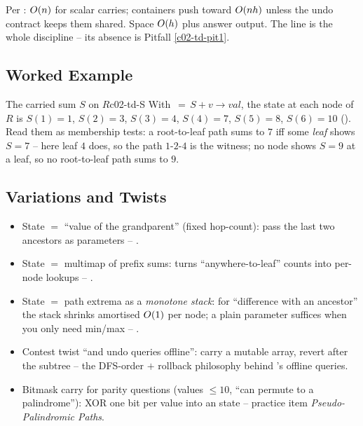 \begin{complexitybox}
Per : $O(n)$ for scalar carries; containers push
toward $O(nh)$ unless the undo contract keeps them shared. Space $O(h)$
plus answer output. The  line is the whole discipline -- its absence
is Pitfall \ref{c02-td-pit1}.
\end{complexitybox}

\subsection{Worked Example}

\begin{example}{The carried sum $S$ on $R$}{c02-td-S}
With ${}\,=\,S + v\to\mathit{val}$, the state at each node of $R$ is
$S(1){=}1$, $S(2){=}3$, $S(3){=}4$, $S(4){=}7$, $S(5){=}8$, $S(6){=}10$
(). Read them as membership tests: a root-to-leaf path sums to
$7$ iff some \emph{leaf} shows $S=7$ -- here leaf $4$ does, so the path
$1\text{-}2\text{-}4$ is the witness; no node shows $S=9$ at a leaf, so no
root-to-leaf path sums to $9$.
\end{example}

\subsection{Variations and Twists}

\begin{itemize}[nosep]
  \item State $=$ ``value of the grandparent'' (fixed hop-count): pass the last
        two ancestors as parameters -- .      \hfill{}
  \item State $=$ multimap of prefix sums: turns ``anywhere-to-leaf'' counts into
        per-node lookups -- .                \hfill{}
  \item State $=$ path extrema as a \emph{monotone stack}: for
        ``difference with an ancestor'' the stack shrinks amortised
        $O(1)$ per node; a plain parameter suffices when you only need
        min/max -- .                             \hfill{}
  \item Contest twist ``and undo queries offline'': carry a mutable array, revert
        after the subtree -- the DFS-order $+$ rollback philosophy behind
        's offline queries.                                 \hfill{}
  \item Bitmask carry for parity questions (values $\le 10$, ``can permute to a
        palindrome''): XOR one bit per value into an  state --
        practice item \emph{Pseudo-Palindromic Paths}.                 \hfill{}
\end{itemize}

